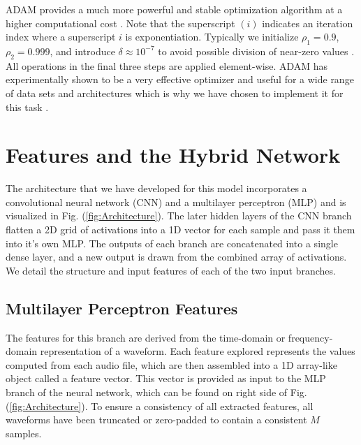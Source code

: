 \documentclass[conference,onecolumn,letterpaper]{IEEEtran}
\begin{document}
ADAM provides a much more powerful and stable optimization algorithm at a higher computational cost \cite{Geron}. Note that the superscript $(i)$ indicates an iteration index where a superscript $i$ is exponentiation. Typically we initialize $\rho_1 = 0.9$, $\rho_2 = 0.999$, and introduce $\delta \approx 10^{-7}$ to avoid possible division of near-zero values \cite{Goodfellow}. All operations in the final three steps are applied element-wise. ADAM has experimentally shown to be a very effective optimizer and useful for a wide range of data sets and architectures which is why we have chosen to implement it for this task \cite{Geron,Goodfellow}.


\section{Features and the Hybrid Network}
\label{sec:Features}

The architecture that we have developed for this model incorporates a convolutional neural network (CNN) and a multilayer perceptron (MLP) and is visualized in Fig. (\ref{fig:Architecture}). The later hidden layers of the CNN branch flatten a 2D grid of activations into a 1D vector for each sample and pass it them into it's own MLP. The outputs of each branch are concatenated into a single dense layer, and a new output is drawn from the combined array of activations. We detail the structure and input features of each of the two input branches.


\subsection{Multilayer Perceptron Features}
\label{subsec:FeaturesMLP}

The features for this branch are derived from the time-domain or frequency-domain representation of a waveform. Each feature explored represents the values computed from each audio file, which are then assembled into a 1D array-like object called a feature vector. This vector is provided as input to the MLP branch of the neural network, which can be found on right side of Fig. (\ref{fig:Architecture}). To ensure a consistency of all extracted features, all waveforms have been truncated or zero-padded to contain a consistent $M$ samples.
\end{document}
